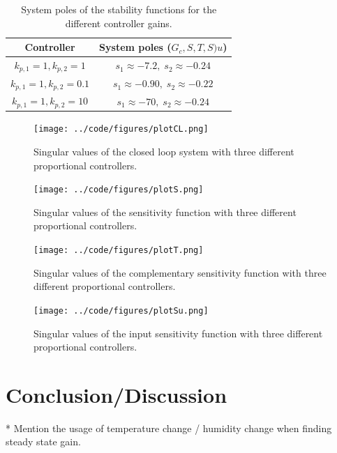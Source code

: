 \documentclass[a4paper, titlepage]{article}
\begin{document}
\begin{table}[h!]
\begin{center}
\begin{tabular}{||c | c ||}
 \hline
 Controller & System poles ($G_c, S, T, S)u$) \\ [0.5ex] 
 \hline\hline
 $k_{p,1} = 1, k_{p,2} = 1$ &  $s_1 \approx -7.2, \; s_2 \approx -0.24$ \\ 
 \hline
 $k_{p,1} = 1, k_{p,2} = 0.1$ &  $s_1 \approx -0.90, \; s_2 \approx -0.22$ \\
 \hline
 $k_{p,1} = 1, k_{p,2} = 10$ &  $s_1 \approx -70, \; s_2 \approx -0.24$ \\
 \hline
\end{tabular}
\end{center}
\caption{System poles of the stability functions for the different controller gains.}
\label{tab:poles}
\end{table}


\begin{figure}[H]
\center
\texttt{[image: ../code/figures/plotCL.png]}
\caption{Singular values of the closed loop system with three different proportional controllers.}
\label{fig:plotCL}
\end{figure}

\begin{figure}[H]
\center
\texttt{[image: ../code/figures/plotS.png]}
\caption{Singular values of the sensitivity function with three different proportional controllers.}
\label{fig:plotS}
\end{figure}

\begin{figure}[H]
\center
\texttt{[image: ../code/figures/plotT.png]}
\caption{Singular values of the complementary sensitivity function with three different proportional controllers.}
\label{fig:plotT}
\end{figure}

\begin{figure}[H]
\center
\texttt{[image: ../code/figures/plotSu.png]}
\caption{Singular values of the input sensitivity function with three different proportional controllers.}
\label{fig:plotSu}
\end{figure}


\section{Conclusion/Discussion}
* Mention the usage of temperature change / humidity change when finding steady state gain.
\end{document}
